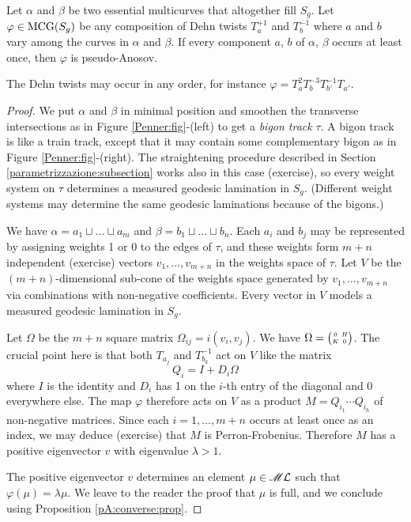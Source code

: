 \begin{teo} \label{Penner:teo}
Let $\alpha$ and $\beta$ be two essential multicurves that altogether fill $S_g$. Let $\varphi\in{\rm MCG}(S_g)$ be any composition of Dehn twists $T_a^{+1}$ and $T_b^{-1}$ where $a$ and $b$ vary among the curves in $\alpha$ and $\beta$. If every component $a$, $b$ of $\alpha$, $\beta$ occurs at least once, then $\varphi$ is pseudo-Anosov.
\end{teo}
The Dehn twists may occur in any order, for instance $\varphi = T_{a}^2T_b^{-3}T_{b'}^{-1}T_{a'}$.
\begin{proof}
We put $\alpha$ and $\beta$ in minimal position and smoothen the transverse intersections as in Figure \ref{Penner:fig}-(left) to get a \emph{bigon track} $\tau$. A bigon track is like a train track, except that it may contain some complementary bigon as in Figure \ref{Penner:fig}-(right). The straightening procedure described in Section \ref{parametrizzazione:subsection} works also in this case (exercise), so every weight system on $\tau$ determines a measured geodesic lamination in $S_g$. (Different weight systems may determine the same geodesic laminations because of the bigons.)

We have $\alpha = a_1 \sqcup \ldots \sqcup a_m$ and $\beta = b_1 \sqcup \ldots \sqcup b_n$. Each $a_i$ and $b_j$ may be represented by assigning weights 1 or 0 to the edges of $\tau$, and these weights form $m+n$ independent (exercise) vectors $v_1,\ldots, v_{m+n}$
in the weights space of $\tau$. Let $V$ be the $(m+n)$-dimensional sub-cone of the weights space generated by $v_1,\ldots, v_{m+n}$ via combinations with non-negative coefficients. 
Every vector in $V$ models a measured geodesic lamination in $S_g$.

Let $\Omega$ be the $m+n$ square matrix $\Omega_{ij} = i(v_i, v_j)$. We have $\Omega = \matr 0HK0$. The crucial point here is that both $T_{a_j}$ and $T_{b_k}^{-1}$ act on $V$ like the matrix 
$$Q_i = I + D_i\Omega$$
where $I$ is the identity and $D_i$ has 1 on the $i$-th entry of the diagonal and 0 everywhere else. The map $\varphi$ therefore acts on $V$ as a product $M = Q_{i_1} \cdots Q_{i_h}$ of non-negative matrices. Since each $i=1,\ldots,m+n$ occurs at least once as an index, we may deduce (exercise) that $M$ is Perron-Frobenius. Therefore $M$ has a positive eigenvector $v$ with eigenvalue $\lambda > 1$.

The positive eigenvector $v$ determines an element $\mu \in \mathscr{M}\mathcal{L}$ such that $\varphi(\mu) = \lambda \mu$. We leave to the reader the proof that $\mu$ is full, %
and we conclude using Proposition \ref{pA:converse:prop}.
\end{proof}

